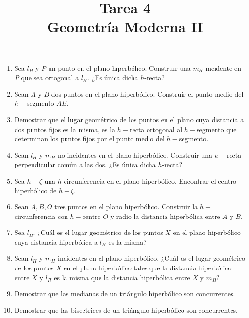 \documentclass[12pt]{article}
\title{Tarea 4 \\
Geometría Moderna II}
\theoremstyle{definition}
\begin{document}
\maketitle

\begin{enumerate}

\item Sea $l_H$ y $P$ un punto en el plano hiperbólico. Construir una $m_H$ incidente en $P$ que sea ortogonal a $l_H$. ¿Es única dicha $h$-recta?

\item Sean $A$ y $B$ dos puntos en el plano hiperbólico. Construir el punto medio del $h-$segmento $AB$.

\item Demostrar que el lugar geométrico de los puntos en el plano cuya distancia a dos puntos fijos es la misma, es la $h-$recta ortogonal al $h-$segmento que determinan los puntos fijos por el punto medio del $h-$segmento.

\item Sean $l_H$ y $m_H$ no incidentes en el plano hiperbólico. Construir una $h-$recta perpendicular común a las dos. ¿Es única dicha $h$-recta?

\item Sea $h-\zeta$ una $h$-circunferencia en el plano hiperbólico. Encontrar el centro hiperbólico de $h-\zeta$.

\item  Sean $A, B, O$ tres puntos en el plano hiperbólico. Construir la $h-$circunferencia con $h-$centro $O$ y radio la distancia hiperbólica entre $A$ y $B$.

\item Sea $l_H$. ¿Cuál es el lugar geométrico de los puntos $X$ en el plano hiperbólico cuya distancia hiperbólica a $l_H$ es la misma?

\item Sean $l_H$ y $m_H$ incidentes en el plano hiperbólico. ¿Cuál es el lugar geométrico de los puntos $X$ en el plano hiperbólico tales que la distancia hiperbólico entre $X$ y $l_H$ es la misma que la distancia hiperbólica entre $X$ y $m_H$? 

\item Demostrar que las medianas de un triángulo hiperbólico son concurrentes.

\item Demostrar que las bisectrices de un triángulo hiperbólico son concurrentes.

\end{enumerate}
\end{document}

